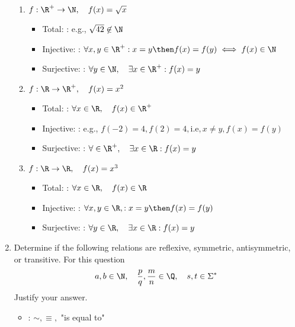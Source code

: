 \documentclass[basic, header]{nosvagor-notes}
\begin{document}
\begin{enumerate}[itemsep=5em]
\begin{enumerate}
    \item \(f : \R^+ \to \N, \quad f(x) = \sqrt{x}\)
      \begin{itemize}
        \item Total: : e.g., \(\sqrt{42} \not\in \N\)
        \item Injective: : \(\forall x,y \in \R^+ : x = y \then f(x) = f(y) \iff f(x) \in \N \)
        \item Surjective: : \(\forall y \in \N, \quad \exists x \in \R^+ : f(x) = y \)
      \end{itemize}

    \item \(f : \R \to \R^+, \quad f(x) = x^2\)
      \begin{itemize}
        \item Total: : \(\forall x \in \R, \quad f(x) \in \R^+ \)
        \item Injective: : e.g., \(f(-2) = 4, f(2) = 4, \text{i.e}, x\neq y, f(x) = f(y)\)
        \item Surjective: : \(\forall \in \R^+, \quad \exists x \in \R : f(x) = y \)
      \end{itemize}

    \item \(f : \R \to \R, \quad f(x) = x^3\)
      \begin{itemize}
        \item Total: : \(\forall x \in \R, \quad  f(x) \in \R\)
        \item Injective: : \(\forall x, y \in \R, : x = y \then f(x) = f(y)\)
        \item Surjective: : \(\forall y \in \R, \quad \exists x \in \R : f(x) = y\)
      \end{itemize}

  \end{enumerate}

  \item Determine if the following relations are reflexive, symmetric,
    antisymmetric, or  transitive. For this question
    \[%
      a,b \in \N, \quad \frac{p}{q}, \frac{m}{n} \in \Q, \quad s, t\in \Sigma^*
    \]%
    Justify your answer.

    \begin{itemize}
      \item
        :
        \(\sim, \equiv,\) "is equal to"


\end{itemize}
\end{enumerate}
\end{document}
